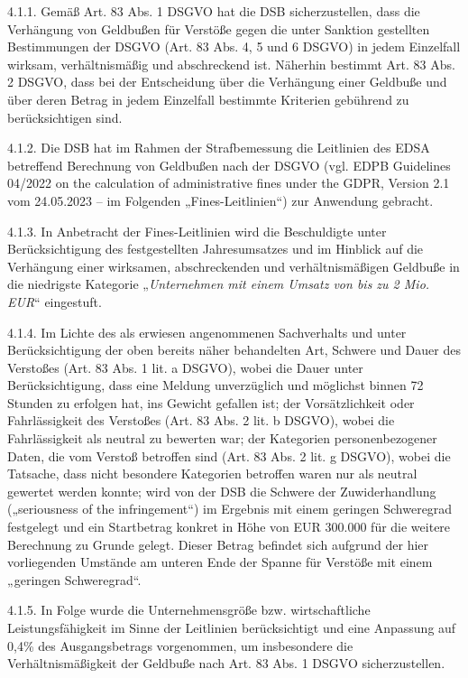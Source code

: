\documentclass[11pt,a4paper]{article}
\begin{document}
4.1.1. Gemäß Art. 83 Abs. 1 DSGVO hat die DSB sicherzustellen, dass die Verhängung von Geldbußen für Verstöße gegen die unter Sanktion gestellten Bestimmungen der DSGVO (Art. 83 Abs. 4, 5 und 6 DSGVO) in jedem Einzelfall wirksam, verhältnismäßig und abschreckend ist. Näherhin bestimmt Art. 83 Abs. 2 DSGVO, dass bei der Entscheidung über die Verhängung einer Geldbuße und über deren Betrag in jedem Einzelfall bestimmte Kriterien gebührend zu berücksichtigen sind.

4.1.2. Die DSB hat im Rahmen der Strafbemessung die Leitlinien des EDSA betreffend Berechnung von Geldbußen nach der DSGVO (vgl. EDPB Guidelines 04/2022 on the calculation of administrative fines under the GDPR, Version 2.1 vom 24.05.2023 – im Folgenden „Fines-Leitlinien“) zur Anwendung gebracht.

4.1.3. In Anbetracht der Fines-Leitlinien wird die Beschuldigte unter Berücksichtigung des festgestellten Jahresumsatzes und im Hinblick auf die Verhängung einer wirksamen, abschreckenden und verhältnismäßigen Geldbuße in die niedrigste Kategorie „\textit{Unternehmen mit einem Umsatz von bis zu 2 Mio. EUR}“ eingestuft.

4.1.4. Im Lichte des als erwiesen angenommenen Sachverhalts und unter Berücksichtigung der oben bereits näher behandelten Art, Schwere und Dauer des Verstoßes (Art. 83 Abs. 1 lit. a DSGVO), wobei die Dauer unter Berücksichtigung, dass eine Meldung unverzüglich und möglichst binnen 72 Stunden zu erfolgen hat, ins Gewicht gefallen ist; der Vorsätzlichkeit oder Fahrlässigkeit des Verstoßes (Art. 83 Abs. 2 lit. b DSGVO), wobei die Fahrlässigkeit als neutral zu bewerten war; der Kategorien personenbezogener Daten, die vom Verstoß betroffen sind (Art. 83 Abs. 2 lit. g DSGVO), wobei die Tatsache, dass nicht besondere Kategorien betroffen waren nur als neutral gewertet werden konnte; wird von der DSB die Schwere der Zuwiderhandlung („seriousness of the infringement“) im Ergebnis mit einem geringen Schweregrad festgelegt und ein Startbetrag konkret in Höhe von EUR 300.000 für die weitere Berechnung zu Grunde gelegt. Dieser Betrag befindet sich aufgrund der hier vorliegenden Umstände am unteren Ende der Spanne für Verstöße mit einem „geringen Schweregrad“.

4.1.5. In Folge wurde die Unternehmensgröße bzw. wirtschaftliche Leistungsfähigkeit im Sinne der Leitlinien berücksichtigt und eine Anpassung auf 0,4\% des Ausgangsbetrags vorgenommen, um insbesondere die Verhältnismäßigkeit der Geldbuße nach Art. 83 Abs. 1 DSGVO sicherzustellen.
\end{document}
